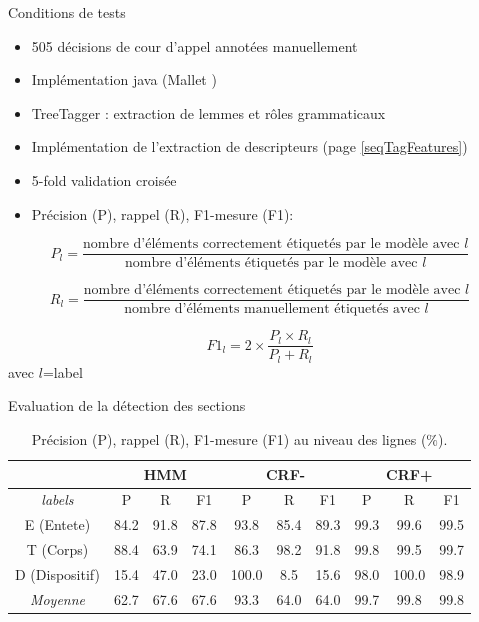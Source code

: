 \documentclass[newPxFont,pagenumber]{beamer}
\begin{document}



\begin{frame}[c]{Conditions de tests}
\begin{itemize}
\item 505 décisions de cour d'appel annotées manuellement
\item Implémentation java (Mallet \cite{McCallum2002Mallet})
\item TreeTagger : extraction de lemmes et rôles grammaticaux
\item Implémentation de l'extraction de descripteurs (page \ref{seqTagFeatures})
\item 5-fold validation croisée
\item Précision (P), rappel (R), F1-mesure (F1):
\end{itemize}
\footnotesize
\[ P_l = \frac{\text{nombre d'éléments correctement étiquetés par le modèle avec } l}{\text{nombre d'éléments  étiquetés par le modèle avec } l} \]

\[ R_l = \frac{\text{nombre d'éléments correctement étiquetés par le modèle avec } l}{\text{nombre d'éléments manuellement étiquetés avec } l} \]

\[ F1_l = 2 \times \frac{P_l \times R_l }{P_l + R_l} \]
avec $l$=label
\end{frame}


\begin{frame}[c]{Evaluation de la détection des sections}
\begin{table}[!htb]
\footnotesize
\centering
\begin{tabular}{|c|c|c|c|c|c|c|c|c|c|}
\hline
 & \multicolumn{3}{c|}{HMM} & \multicolumn{3}{c|}{CRF-} & \multicolumn{3}{c|}{CRF+} \\
\hline
\textit{labels} & P & R & F1  & P & R & F1 & P & R & F1 \\
\hline
E (Entete)& 84.2 & 91.8 & 87.8  & 93.8 & 85.4 & 89.3 & 99.3 & 99.6 & 99.5 \\
\hline
T (Corps)& 88.4 & 63.9 & 74.1  & 86.3 & 98.2 & 91.8 & 99.8 & 99.5 & 99.7\\
\hline
D (Dispositif)& 15.4 & 47.0 & 23.0  & 100.0 & 8.5 & 15.6 & 98.0 & 100.0 & 98.9 \\
\hline
\textit{Moyenne} & 62.7 & 67.6 & 67.6  & 93.3 & 64.0 & 64.0 & 99.7 & 99.8 & 99.8  \\
\hline
\end{tabular}
\caption{Précision (P), rappel (R), F1-mesure (F1) au niveau des lignes ($\%$).}
\label{prf-zoning}
\end{table}
\end{frame}
\end{document}
